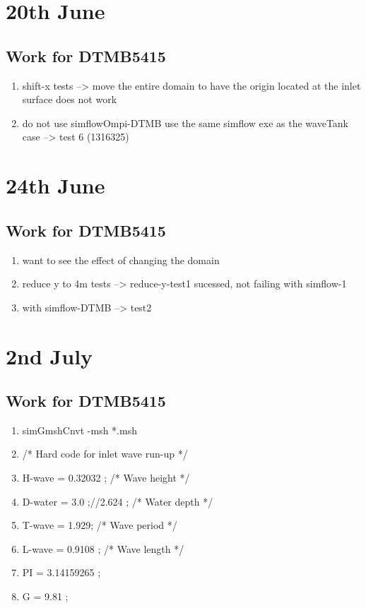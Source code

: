 \documentclass[12pt]{article} %
\begin{document}
\section{20th June}
\subsection{Work for DTMB5415}
\begin{enumerate}
    \item shift-x tests --> move the entire domain to have the origin located at the inlet surface does not work 
    \item do not use simflowOmpi-DTMB use the same simflow exe as the waveTank case --> test 6 (1316325)
\end{enumerate}
\section{24th June}
\subsection{Work for DTMB5415}
\begin{enumerate}
    \item want to see the effect of changing the domain
    \item reduce y to 4m tests --> reduce-y-test1 sucessed, not failing with simflow-1
    \item with simflow-DTMB --> test2
\end{enumerate}
\section{2nd July}
\subsection{Work for DTMB5415}
\begin{enumerate}
    \item simGmshCnvt -msh *.msh 
    \item /* Hard code for inlet wave run-up */
    \item H-wave = 0.32032 ;          /* Wave height */
    \item D-water = 3.0 ;//2.624 ;         /* Water depth */
    \item T-wave = 1.929;       /* Wave period */
    \item L-wave = 0.9108 ;          /* Wave length */
    \item PI = 3.14159265 ;
    \item G = 9.81 ;
\end{enumerate}
\end{document}

